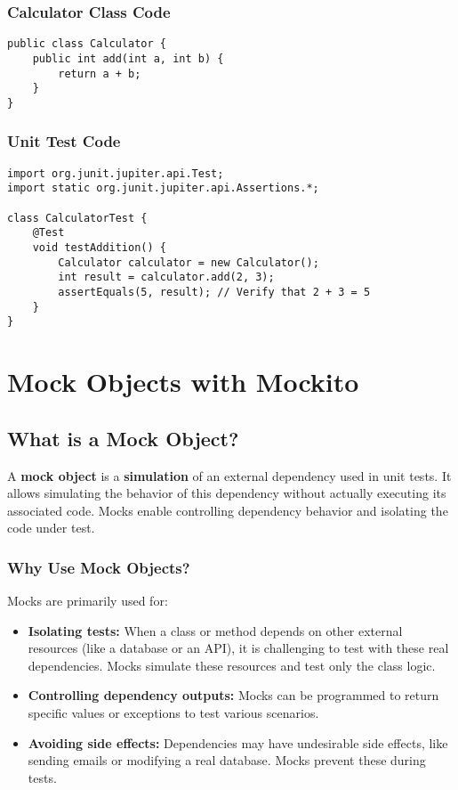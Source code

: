 \documentclass[12pt,a4paper]{article}
\begin{document}
\subsubsection{Calculator Class Code}
\begin{lstlisting}
public class Calculator {
    public int add(int a, int b) {
        return a + b;
    }
}
\end{lstlisting}

\subsubsection{Unit Test Code}
\begin{lstlisting}
import org.junit.jupiter.api.Test;
import static org.junit.jupiter.api.Assertions.*;

class CalculatorTest {
    @Test
    void testAddition() {
        Calculator calculator = new Calculator();
        int result = calculator.add(2, 3);
        assertEquals(5, result); // Verify that 2 + 3 = 5
    }
}
\end{lstlisting}

\newpage

\section{Mock Objects with Mockito}
\subsection{What is a Mock Object?}
A \textbf{mock object} is a \textbf{simulation} of an external dependency used in unit tests. It allows simulating the behavior of this dependency without actually executing its associated code. Mocks enable controlling dependency behavior and isolating the code under test.

\subsubsection{Why Use Mock Objects?}
Mocks are primarily used for:
\begin{itemize}
    \item \textbf{Isolating tests:} When a class or method depends on other external resources (like a database or an API), it is challenging to test with these real dependencies. Mocks simulate these resources and test only the class logic.
    \item \textbf{Controlling dependency outputs:} Mocks can be programmed to return specific values or exceptions to test various scenarios.
    \item \textbf{Avoiding side effects:} Dependencies may have undesirable side effects, like sending emails or modifying a real database. Mocks prevent these during tests.
\end{itemize}
\end{document}
